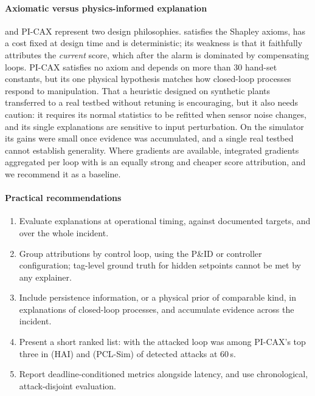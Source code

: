 \paragraph{Axiomatic versus physics-informed explanation}
\LX{} and PI-CAX represent two design philosophies. \LX{} satisfies the Shapley axioms, has a cost fixed at design time and is deterministic; its weakness is that it faithfully attributes the \emph{current} score, which after the alarm is dominated by compensating loops. PI-CAX satisfies no axiom and depends on more than 30 hand-set constants, but its one physical hypothesis matches how closed-loop processes respond to manipulation. That a heuristic designed on synthetic plants transferred to a real testbed without retuning is encouraging, but it also needs caution: it requires its normal statistics to be refitted when sensor noise changes, and its single explanations are sensitive to input perturbation. On the simulator its gains were small once evidence was accumulated, and a single real testbed cannot establish generality. Where gradients are available, integrated gradients aggregated per loop with \TEA{} is an equally strong and cheaper score attribution, and we recommend it as a baseline.

\paragraph{Practical recommendations}
\begin{enumerate}
\item Evaluate explanations at operational timing, against documented targets, and over the whole incident.
\item Group attributions by control loop, using the P\&ID or controller configuration; tag-level ground truth for hidden setpoints cannot be met by any explainer.
\item Include persistence information, or a physical prior of comparable kind, in explanations of closed-loop processes, and accumulate evidence across the incident.
\item Present a short ranked list: with \TEA{} the attacked loop was among PI-CAX's top three in \lochaiPICAXalarmSixZeroteahrThree{} (HAI) and \locsimPICAXalarmSixZeroteahrThree{} (PCL-Sim) of detected attacks at 60\,s.
\item Report deadline-conditioned metrics alongside latency, and use chronological, attack-disjoint evaluation.
\end{enumerate}


